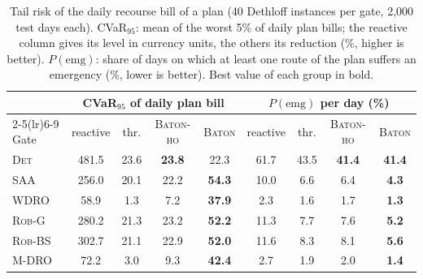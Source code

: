 \begin{table}[t]
\caption{Tail risk of the daily recourse bill of a plan (40 Dethloff
instances per gate, 2{,}000 test days each). CVaR$_{95}$: mean of the
worst 5\% of daily plan bills; the reactive column gives its level in
currency units, the others its reduction (\%, higher is better).
$P(\mathrm{emg})$: share of days on which at least one route of the plan
suffers an emergency (\%, lower is better). Best value of each group in
bold.}
\label{tab:tail}
\centering
\footnotesize
\setlength{\tabcolsep}{3.5pt}
\begin{tabular}{l c ccc cccc}
\toprule
& \multicolumn{4}{c}{CVaR$_{95}$ of daily plan bill} &
\multicolumn{4}{c}{$P(\mathrm{emg})$ per day (\%)} \\
\cmidrule(lr){2-5}\cmidrule(lr){6-9}
Gate & reactive & thr. & \textsc{Baton-ho} & \textsc{Baton} &
reactive & thr. & \textsc{Baton-ho} & \textsc{Baton} \\
\midrule
\textsc{Det} & 481.5 & 23.6 & \textbf{23.8} & 22.3 & 61.7 & 43.5 & \textbf{41.4} & \textbf{41.4} \\
\textsc{SAA} & 256.0 & 20.1 & 22.2 & \textbf{54.3} & 10.0 & 6.6 & 6.4 & \textbf{4.3} \\
\textsc{WDRO} & 58.9 & 1.3 & 7.2 & \textbf{37.9} & 2.3 & 1.6 & 1.7 & \textbf{1.3} \\
\textsc{Rob-G} & 280.2 & 21.3 & 23.2 & \textbf{52.2} & 11.3 & 7.7 & 7.6 & \textbf{5.2} \\
\textsc{Rob-BS} & 302.7 & 21.1 & 22.9 & \textbf{52.0} & 11.6 & 8.3 & 8.1 & \textbf{5.6} \\
\textsc{M-DRO} & 72.2 & 3.0 & 9.3 & \textbf{42.4} & 2.7 & 1.9 & 2.0 & \textbf{1.4} \\
\bottomrule
\end{tabular}
\end{table}
